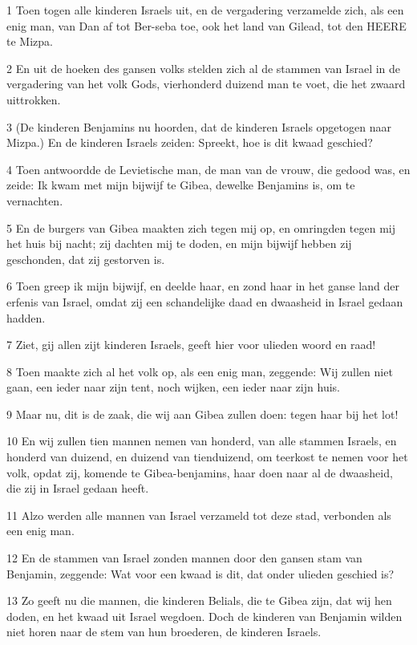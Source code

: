\par 1 Toen togen alle kinderen Israels uit, en de vergadering verzamelde zich, als een enig man, van Dan af tot Ber-seba toe, ook het land van Gilead, tot den HEERE te Mizpa.
\par 2 En uit de hoeken des gansen volks stelden zich al de stammen van Israel in de vergadering van het volk Gods, vierhonderd duizend man te voet, die het zwaard uittrokken.
\par 3 (De kinderen Benjamins nu hoorden, dat de kinderen Israels opgetogen naar Mizpa.) En de kinderen Israels zeiden: Spreekt, hoe is dit kwaad geschied?
\par 4 Toen antwoordde de Levietische man, de man van de vrouw, die gedood was, en zeide: Ik kwam met mijn bijwijf te Gibea, dewelke Benjamins is, om te vernachten.
\par 5 En de burgers van Gibea maakten zich tegen mij op, en omringden tegen mij het huis bij nacht; zij dachten mij te doden, en mijn bijwijf hebben zij geschonden, dat zij gestorven is.
\par 6 Toen greep ik mijn bijwijf, en deelde haar, en zond haar in het ganse land der erfenis van Israel, omdat zij een schandelijke daad en dwaasheid in Israel gedaan hadden.
\par 7 Ziet, gij allen zijt kinderen Israels, geeft hier voor ulieden woord en raad!
\par 8 Toen maakte zich al het volk op, als een enig man, zeggende: Wij zullen niet gaan, een ieder naar zijn tent, noch wijken, een ieder naar zijn huis.
\par 9 Maar nu, dit is de zaak, die wij aan Gibea zullen doen: tegen haar bij het lot!
\par 10 En wij zullen tien mannen nemen van honderd, van alle stammen Israels, en honderd van duizend, en duizend van tienduizend, om teerkost te nemen voor het volk, opdat zij, komende te Gibea-benjamins, haar doen naar al de dwaasheid, die zij in Israel gedaan heeft.
\par 11 Alzo werden alle mannen van Israel verzameld tot deze stad, verbonden als een enig man.
\par 12 En de stammen van Israel zonden mannen door den gansen stam van Benjamin, zeggende: Wat voor een kwaad is dit, dat onder ulieden geschied is?
\par 13 Zo geeft nu die mannen, die kinderen Belials, die te Gibea zijn, dat wij hen doden, en het kwaad uit Israel wegdoen. Doch de kinderen van Benjamin wilden niet horen naar de stem van hun broederen, de kinderen Israels.
